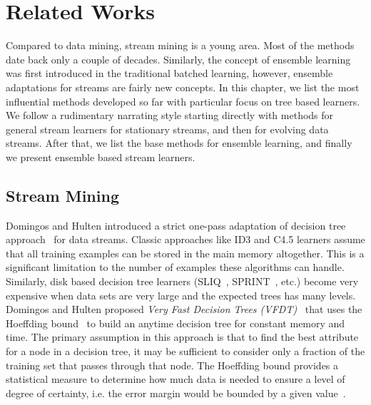 \section{Related Works}
\label{chp:relworks}
Compared to data mining, stream mining is a young area. Most of the methods date back only a couple of decades. Similarly, the concept of ensemble learning was first introduced in the traditional batched learning, however, ensemble adaptations for streams are fairly new concepts. In this chapter, we list the most influential methods developed so far with particular focus on tree based learners. We follow a rudimentary narrating style starting directly with methods for general stream learners for stationary streams, and then for evolving data streams. After that, we list the base methods for ensemble learning, and finally we present ensemble based stream learners.

\subsection{Stream Mining}

Domingos and Hulten introduced a strict one-pass adaptation of decision tree approach~\cite{breiman84:dt,quinlan93:c45} for data streams. Classic approaches like ID3 and C4.5 learners assume that all training examples can be stored in the main memory altogether. This is a significant limitation to the number of examples these algorithms can handle. Similarly, disk based decision tree learners (SLIQ~\cite{mehta96:sliq}, SPRINT~\cite{shafer96:sprint}, etc.) become very expensive when data sets are very large and the expected trees has many levels. Domingos and Hulten proposed \textit{Very Fast Decision Trees (VFDT)}~\cite{domingos00:vfdt} that uses the Hoeffding bound~\cite{hoeffding63:bound} to build an anytime decision tree for constant memory and time. The primary assumption in this approach is that to find the best attribute for a node in a decision tree, it may be sufficient to consider only a fraction of the training set that passes through that node. The Hoeffding bound provides a statistical measure to determine how much data is needed to ensure a level of degree of certainty, i.e. the error margin would be bounded by a given value~\cite{catlett91:thesis}.

